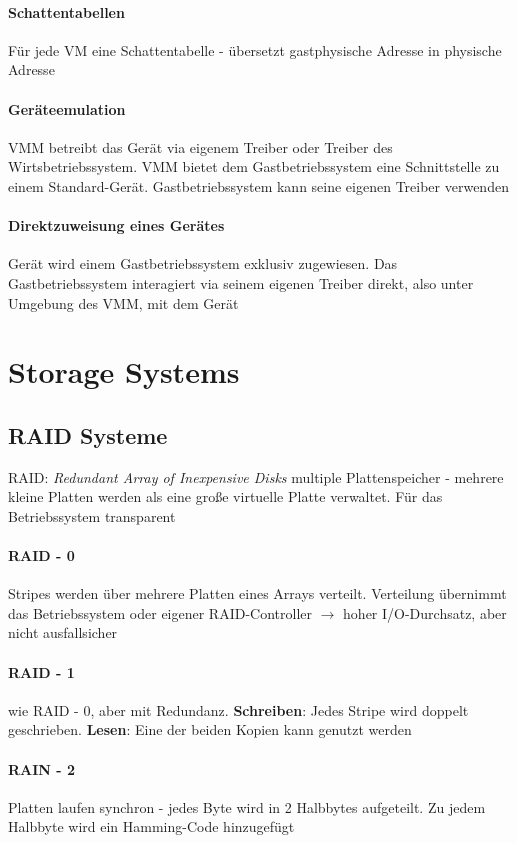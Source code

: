 \documentclass[11pt,a4paper,landscape]{article}
\begin{document}
\begin{multicols*}{3}
	\paragraph{Schattentabellen} Für jede VM eine Schattentabelle - übersetzt gastphysische Adresse in physische Adresse
	\paragraph{Geräteemulation} VMM betreibt das Gerät via eigenem Treiber oder Treiber des Wirtsbetriebssystem. VMM bietet dem Gastbetriebssystem eine Schnittstelle zu einem Standard-Gerät. Gastbetriebssystem kann seine eigenen Treiber verwenden
	\paragraph{Direktzuweisung eines Gerätes} Gerät wird einem Gastbetriebssystem exklusiv zugewiesen. Das Gastbetriebssystem interagiert via seinem eigenen Treiber direkt, also unter Umgebung des VMM, mit dem Gerät
	\section{Storage Systems}
	\subsection{RAID Systeme}
	RAID: \textit{Redundant Array of Inexpensive Disks} multiple Plattenspeicher - mehrere kleine Platten werden als eine große virtuelle Platte verwaltet. Für das Betriebssystem transparent
	\paragraph{RAID - 0} Stripes werden über mehrere Platten eines Arrays verteilt. Verteilung übernimmt das Betriebssystem oder eigener RAID-Controller $\rightarrow$ hoher I/O-Durchsatz, aber nicht ausfallsicher
	\paragraph{RAID - 1} wie RAID - 0, aber mit Redundanz. \textbf{Schreiben}: Jedes Stripe wird doppelt geschrieben. \textbf{Lesen}: Eine der beiden Kopien kann genutzt werden
	\paragraph{RAIN - 2} Platten laufen synchron - jedes Byte wird in 2 Halbbytes aufgeteilt. Zu jedem Halbbyte wird ein Hamming-Code hinzugefügt

\end{multicols*}
\end{document}
